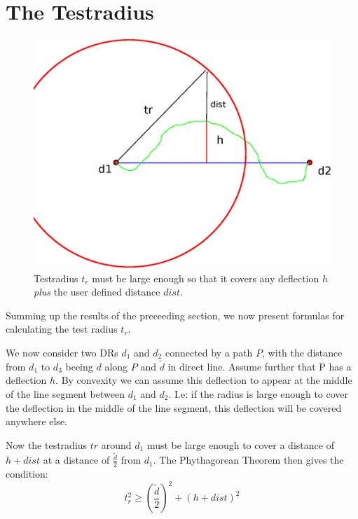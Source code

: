 \section{The Testradius}
\begin{figure}[h]
\includegraphics[scale=0.5]{images/03.06.testradius.eps}
\caption{Testradius $t_r$ must be large enough so that it covers any deflection $h$ \emph{plus} the user 
	 defined distance $dist$.
	}
\end{figure}

Summing up the results of the preceeding section, we now present formulas for calculating the 
test radius $t_r$.

We now consider two DRs $d_1$ and $d_2$ connected by a path $P$, with the distance from $d_1$ to $d_3$ beeing
$d$ along $P$ and $\tilde{d}$ in direct line. 
Assume further that P has a deflection $h$. By convexity we can assume this deflection to appear at the middle
of the line segment between $d_1$ and $d_2$. I.e: if the radius is large enough to cover the deflection
in the middle of the line segment, this deflection will be covered anywhere else.

Now the testradius $tr$ around $d_1$ must be large enough to cover a distance of $h+dist$ at a distance of $\frac{\tilde{d}}{2}$
from $d_1$.  The Phythagorean Theorem then gives the condition:
\begin{equation}
\label{testradius_condition}
 t_r^2  \geq \left(\frac{\tilde{d}}{2}\right)^2 + \left(h+dist\right)^2
\end{equation}


